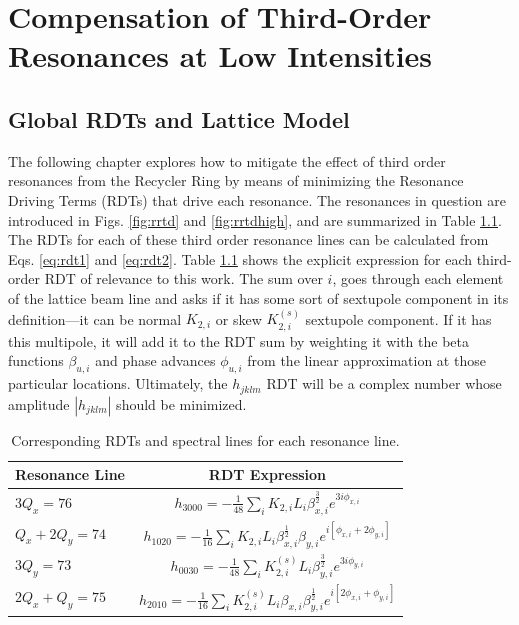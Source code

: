 \chapter{Compensation of Third-Order Resonances at Low Intensities}
\label{sec:ch4}

\section{Global RDTs and Lattice Model}

The following chapter explores how to mitigate the effect of third order resonances from the Recycler Ring by means of minimizing the Resonance Driving Terms (RDTs) that drive each resonance. The resonances in question are introduced in Figs. \ref{fig:rrtd} and \ref{fig:rrtdhigh}, and are summarized in Table \ref{tab:rdts}. The RDTs for each of these third order resonance lines can be calculated from Eqs. \ref{eq:rdt1} and \ref{eq:rdt2}. Table \ref{tab:rdts} shows the explicit expression for each third-order RDT of relevance to this work. The sum over $i$, goes through each element of the lattice beam line and asks if it has some sort of sextupole component in its definition---it can be normal $K_{2,i}$ or skew $K_{2,i}^{(s)}$ sextupole component. If it has this multipole, it will add it to the RDT sum by weighting it with the beta functions $\beta_{u,i}$ and phase advances $\phi_{u,i}$ from the linear approximation at those particular locations. Ultimately, the $h_{jklm}$ RDT will be a complex number whose amplitude $|h_{jklm}|$ should be minimized.

\begin{table}[H]
    \centering
    \caption{Corresponding RDTs and spectral lines for each resonance line.}
    \begin{tabular}{lc}
        \toprule
        \textbf{Resonance Line} & \textbf{RDT Expression} \\
        \midrule
            $3Q_x=76$     & $\displaystyle{h_{3000} = -\frac{1}{48}\sum_i K_{2,i} L_i \beta_{x,i}^{\frac{3}{2}} e^{3i\phi_{x,i}}}$    \\ %
           $Q_x+2Q_y=74$   &  $\displaystyle{h_{1020} = -\frac{1}{16} \sum_i K_{2,i} L_i \beta_{x,i}^{\frac{1}{2}} \beta_{y,i} e^{i \left[ \phi_{x,i} + 2\phi_{y,i}\right]} }$       \\ %
            $3Q_y=73$     &  $ \displaystyle{h_{0030} = -\frac{1}{48}\sum_i K_{2,i}^{(s)} L_i \beta_{y,i}^{\frac{3}{2}} e^{3i\phi_{y,i}}}$ \\ %
            $2Q_x+Q_y=75$   & $ \displaystyle{h_{2010} = -\frac{1}{16}\sum_i K_{2,i}^{(s)} L_i \beta_{x,i} \beta_{y,i}^{\frac{1}{2}} e^{i \left[ 2\phi_{x,i} + \phi_{y,i}\right]}}$       \\
        \bottomrule
    \end{tabular}
    \label{tab:rdts}
\end{table}

